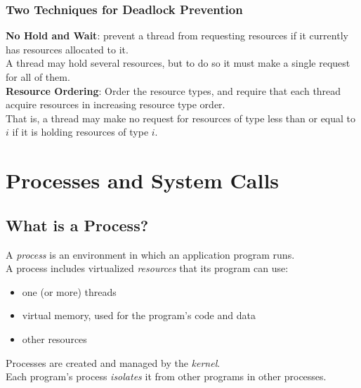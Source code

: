 \documentclass[12pt]{article}
\theoremstyle{plain}
\theoremstyle{definition}
\begin{document}
\subsubsection{Two Techniques for Deadlock Prevention}
\textbf{No Hold and Wait}:
prevent a thread from requesting resources if it currently has resources allocated to it. \\
A thread may hold several resources, but to do so it must make a single request for all of them. \\

\textbf{Resource Ordering}:
Order the resource types, and require that each thread acquire resources in increasing resource type order. \\
That is, a thread may make no request for resources of type less than or equal to $i$ if it is holding resources of type $i$.


\newpage
\section{Processes and System Calls}
\subsection{What is a Process?}
A \emph{process} is an environment in which an application program runs. \\
A process includes virtualized \emph{resources} that its program can use:
\begin{itemize}
  \item one (or more) threads
  \item virtual memory, used for the program's code and data
  \item other resources
\end{itemize}
Processes are created and managed by the \emph{kernel}. \\
Each program's process \emph{isolates} it from other programs in other processes.
\end{document}
